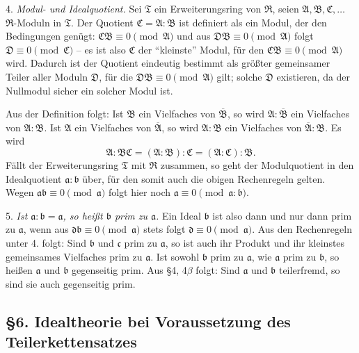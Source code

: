 \documentclass[11pt]{article}
\providecommand{\mR}{\mathfrak{R}}
\providecommand{\mT}{\mathfrak{T}}
\providecommand{\mA}{\mathfrak{A}}
\providecommand{\mB}{\mathfrak{B}}
\providecommand{\mC}{\mathfrak{C}}
\providecommand{\mD}{\mathfrak{D}}
\providecommand{\ma}{\mathfrak{a}}
\providecommand{\mb}{\mathfrak{b}}
\providecommand{\mc}{\mathfrak{c}}
\providecommand{\md}{\mathfrak{d}}
\begin{document}
4. \emph{Modul- und Idealquotient.} Sei $\mT$ ein Erweiterungsring von $\mR$, seien $\mA,\mB,\mC,\ldots$ $\mR$-Moduln in $\mT$. Der Quotient $\mC=\mA:\mB$ ist definiert als ein Modul, der den Bedingungen genügt: $\mC\mB\equiv0\pmod{\mA}$ und aus $\mD\mB\equiv0\pmod{\mA}$ folgt $\mD\equiv0\pmod{\mC}$ -- es ist also $\mC$ der ``kleinste'' Modul, für den $\mC\mB\equiv0\pmod{\mA}$ wird. Dadurch ist der Quotient eindeutig bestimmt als größter gemeinsamer Teiler aller Moduln $\mD$, für die $\mD\mB\equiv0\pmod{\mA}$ gilt; solche $\mD$ existieren, da der Nullmodul sicher ein solcher Modul ist.

Aus der Definition folgt: Ist $\mB$ ein Vielfaches von $\overline{\mB}$, so wird $\mA:\overline{\mB}$ ein Vielfaches von $\mA:\mB$. Ist $\mA$ ein Vielfaches von $\overline{\mA}$, so wird $\mA:\mB$ ein Vielfaches von $\overline{\mA}:\mB$. Es wird
\[
        \mA:\mB\mC=(\mA:\mB):\mC=(\mA:\mC):\mB .
\]
Fällt der Erweiterungsring $\mT$ mit $\mR$ zusammen, so geht der Modulquotient in den Idealquotient $\ma:\mb$ über, für den somit auch die obigen Rechenregeln gelten. Wegen $\ma\mb\equiv0\pmod{\ma}$ folgt hier noch $\ma\equiv0\pmod{\ma:\mb}$.

5. \emph{Ist $\ma:\mb=\ma$, so heißt $\mb$ prim zu $\ma$.} Ein Ideal $\mb$ ist also dann und nur dann prim zu $\ma$, wenn aus $\md\mb\equiv0\pmod{\ma}$ stets folgt $\md\equiv0\pmod{\ma}$. Aus den Rechenregeln unter 4. folgt: Sind $\mb$ und $\mc$ prim zu $\ma$, so ist auch ihr Produkt und ihr kleinstes gemeinsames Vielfaches prim zu $\ma$. Ist sowohl $\mb$ prim zu $\ma$, wie $\ma$ prim zu $\mb$, so heißen $\ma$ und $\mb$ gegenseitig prim. Aus §4, 4$\beta$ folgt: Sind $\ma$ und $\mb$ teilerfremd, so sind sie auch gegenseitig prim.

\setcounter{footnote}{25}

\subsection*{§6. Idealtheorie bei Voraussetzung des Teilerkettensatzes}
\end{document}

